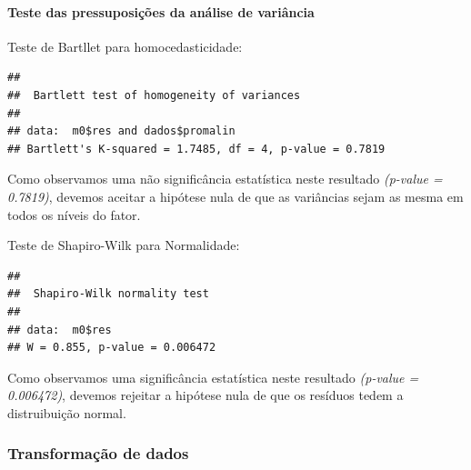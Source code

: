 \documentclass[
]{book}
\newenvironment{Shaded}{\begin{snugshade}}{\end{snugshade}}
\newcommand{\KeywordTok}[1]{\textcolor[rgb]{0.13,0.29,0.53}{\textbf{#1}}}
\newcommand{\NormalTok}[1]{#1}
\newcommand{\OperatorTok}[1]{\textcolor[rgb]{0.81,0.36,0.00}{\textbf{#1}}}
\begin{document}
\hypertarget{teste-das-pressuposiuxe7uxf5es-da-anuxe1lise-de-variuxe2ncia}{%
\paragraph{Teste das pressuposições da análise de variância}\label{teste-das-pressuposiuxe7uxf5es-da-anuxe1lise-de-variuxe2ncia}}

Teste de Bartllet para homocedasticidade:

\begin{Shaded}
\end{Shaded}

\begin{verbatim}
## 
##  Bartlett test of homogeneity of variances
## 
## data:  m0$res and dados$promalin
## Bartlett's K-squared = 1.7485, df = 4, p-value = 0.7819
\end{verbatim}

Como observamos uma não significância estatística neste resultado \emph{(p-value = 0.7819)}, devemos aceitar a hipótese nula de que as variâncias sejam as mesma em todos os níveis do fator.

Teste de Shapiro-Wilk para Normalidade:

\begin{Shaded}
\end{Shaded}

\begin{verbatim}
## 
##  Shapiro-Wilk normality test
## 
## data:  m0$res
## W = 0.855, p-value = 0.006472
\end{verbatim}

Como observamos uma significância estatística neste resultado \emph{(p-value = 0.006472)}, devemos rejeitar a hipótese nula de que os resíduos tedem a distruibuição normal.

\hypertarget{transformauxe7uxe3o-de-dados-1}{%
\subsubsection{Transformação de dados}\label{transformauxe7uxe3o-de-dados-1}}
\end{document}
